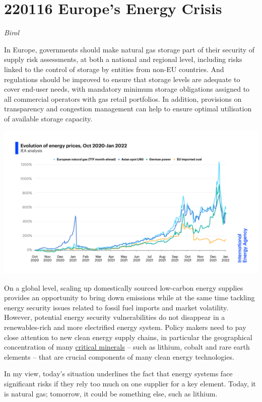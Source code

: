 \documentclass[
]{book}
\begin{document}
\hypertarget{europes-energy-crisis}{%
\section{220116 Europe's Energy Crisis}\label{europes-energy-crisis}}

\emph{Birol}

In Europe, governments should make natural gas storage part of their security of supply risk assessments, at both a national and regional level, including risks linked to the control of storage by entities from non-EU countries. And regulations should be improved to ensure that storage levels are adequate to cover end-user needs, with mandatory minimum storage obligations assigned to all commercial operators with gas retail portfolios. In addition, provisions on transparency and congestion management can help to ensure optimal utilisation of available storage capacity.

\includegraphics{fig/Energy_Prices_Oct2020-jan2022_IEA.png}

On a global level, scaling up domestically sourced low-carbon energy supplies provides an opportunity to bring down emissions while at the same time tackling energy security issues related to fossil fuel imports and market volatility. However, potential energy security vulnerabilities do not disappear in a renewables-rich and more electrified energy system. Policy makers need to pay close attention to new clean energy supply chains, in particular the geographical concentration of many \href{https://www.iea.org/reports/the-role-of-critical-minerals-in-clean-energy-transitions}{critical minerals} -- such as lithium, cobalt and rare earth elements -- that are crucial components of many clean energy technologies.

In my view, today's situation underlines the fact that energy systems face significant risks if they rely too much on one supplier for a key element. Today, it is natural gas; tomorrow, it could be something else, such as lithium.
\end{document}
